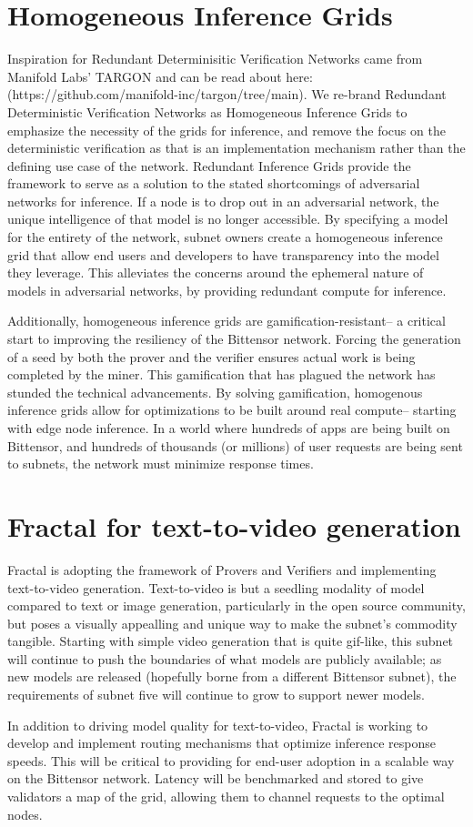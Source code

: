 \documentclass[12pt]{article}
\begin{document}
\section{Homogeneous Inference Grids}
Inspiration for Redundant Determinisitic Verification Networks came from Manifold Labs' TARGON and can be read about here: (https://github.com/manifold-inc/targon/tree/main). We re-brand Redundant Deterministic Verification Networks as Homogeneous Inference Grids to emphasize the necessity of the grids for inference, and remove the focus on the deterministic verification as that is an implementation mechanism rather than the defining use case of the network. Redundant Inference Grids provide the framework to serve as a solution to the stated shortcomings of adversarial networks for inference. If a node is to drop out in an adversarial network, the unique intelligence of that model is no longer accessible. By specifying a model for the entirety of the network, subnet owners create a homogeneous inference grid that allow end users and developers to have transparency into the model they leverage. This alleviates the concerns around the ephemeral nature of models in adversarial networks, by providing redundant compute for inference.
\par Additionally, homogeneous inference grids are gamification-resistant-- a critical start to improving the resiliency of the Bittensor network. Forcing the generation of a seed by both the prover and the verifier ensures actual work is being completed by the miner. This gamification that has plagued the network has stunded the technical advancements. By solving gamification, homogenous inference grids allow for optimizations to be built around real compute-- starting with edge node inference. In a world where hundreds of apps are being built on Bittensor, and hundreds of thousands (or millions) of user requests are being sent to subnets, the network must minimize response times. 


\section{Fractal for text-to-video generation}
Fractal is adopting the framework of Provers and Verifiers and implementing text-to-video generation. Text-to-video is but a seedling modality of model compared to text or image generation, particularly in the open source community, but poses a visually appealling and unique way to make the subnet's commodity tangible. Starting with simple video generation that is quite gif-like, this subnet will continue to push the boundaries of what models are publicly available; as new models are released (hopefully borne from a different Bittensor subnet), the requirements of subnet five will continue to grow to support newer models. \par
In addition to driving model quality for text-to-video, Fractal is working to develop and implement routing mechanisms that optimize inference response speeds. This will be critical to providing for end-user adoption in a scalable way on the Bittensor network. Latency will be benchmarked and stored to give validators a map of the grid, allowing them to channel requests to the optimal nodes. 
\end{document}
